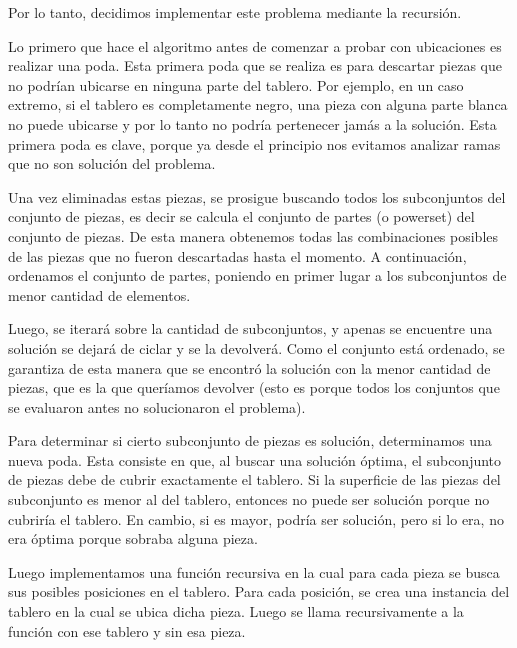 \quad Por lo tanto, decidimos implementar este problema mediante la recursi\'on.



\quad Lo primero que hace el algoritmo antes de comenzar a probar con ubicaciones es realizar una poda. Esta primera poda que se realiza es para descartar piezas que no podrían ubicarse en ninguna parte del tablero. Por ejemplo, en un caso extremo, si el tablero es completamente negro, una pieza con alguna parte blanca no puede ubicarse y por lo tanto no podría pertenecer jamás a la solución. Esta primera poda es clave, porque ya desde el principio nos evitamos analizar ramas que no son solución del problema.

\quad Una vez eliminadas estas piezas, se prosigue buscando todos los subconjuntos del conjunto de piezas, es decir se calcula el conjunto de partes (o powerset) del conjunto de piezas. De esta manera obtenemos todas las combinaciones posibles de las piezas que no fueron descartadas hasta el momento. A continuación, ordenamos el conjunto de partes, poniendo en primer lugar a los subconjuntos de menor cantidad de elementos.

\quad Luego, se iterará sobre la cantidad de subconjuntos, y apenas se encuentre una solución se dejará de ciclar y se la devolverá. Como el conjunto está ordenado, se garantiza de esta manera que se encontró la solución con la menor cantidad de piezas, que es la que queríamos devolver (esto es porque todos los conjuntos que se evaluaron antes no solucionaron el problema).


\quad Para determinar si cierto subconjunto de piezas es soluci\'on, determinamos una nueva poda. Esta consiste en que, al buscar una soluci\'on \'optima, el subconjunto de piezas debe de cubrir exactamente el tablero. Si la superficie de las piezas del subconjunto es menor al del tablero, entonces no puede ser soluci\'on porque no cubriría el tablero. En cambio, si es mayor, podr\'ia ser soluci\'on, pero si lo era, no era \'optima porque sobraba alguna pieza.



\quad Luego implementamos una funci\'on recursiva en la cual para cada pieza se busca sus posibles posiciones en el tablero. Para cada posici\'on, se crea una instancia del tablero en la cual se ubica dicha pieza. Luego se llama recursivamente a la funci\'on con ese tablero y sin esa pieza.

